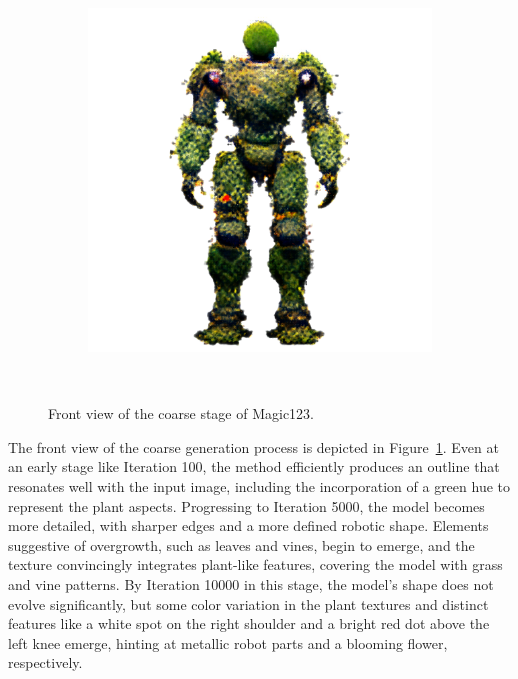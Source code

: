 \begin{figure}[H]
\begin{subfigure}[b]{0.25\textwidth}
        \includegraphics[width=\textwidth]{etc/a robot made out of plants/magic123/magic123_coarse_robot_front_10000_part1.png}
        \caption{}
    \end{subfigure}
    \caption{Front view of the coarse stage of Magic123.}~\label{fig:generationFrontCoarseMagic123}
\end{figure}

The front view of the coarse generation process is depicted in Figure~\ref{fig:generationFrontCoarseMagic123}. Even at an early stage like Iteration 100, the method efficiently produces an outline that resonates well with the input image, including the incorporation of a green hue to represent the plant aspects. Progressing to Iteration 5000, the model becomes more detailed, with sharper edges and a more defined robotic shape. Elements suggestive of overgrowth, such as leaves and vines, begin to emerge, and the texture convincingly integrates plant-like features, covering the model with grass and vine patterns. By Iteration 10000 in this stage, the model's shape does not evolve significantly, but some color variation in the plant textures and distinct features like a white spot on the right shoulder and a bright red dot above the left knee emerge, hinting at metallic robot parts and a blooming flower, respectively.

